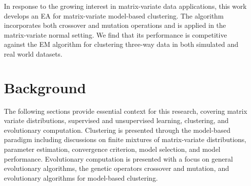 \documentclass[12pt]{report}
\begin{document}
In response to the growing interest in matrix-variate data applications, this work develops an EA for matrix-variate model-based clustering. The algorithm incorporates both crossover and mutation operations and is applied in the matrix-variate normal setting. We find that its performance is competitive against the EM algorithm for clustering three-way data in both simulated and real world datasets.   






\chapter{Background}
The following sections provide essential context for this research, covering matrix variate distributions, supervised and unsupervised learning, clustering, and evolutionary computation. Clustering is presented through the model-based paradigm including discussions on finite mixtures of matrix-variate distributions, parameter estimation, convergence criterion, model selection, and model performance. Evolutionary computation is presented with a focus on general evolutionary algorithms, the genetic operators crossover and mutation, and evolutionary algorithms for model-based clustering. 



\end{document}

